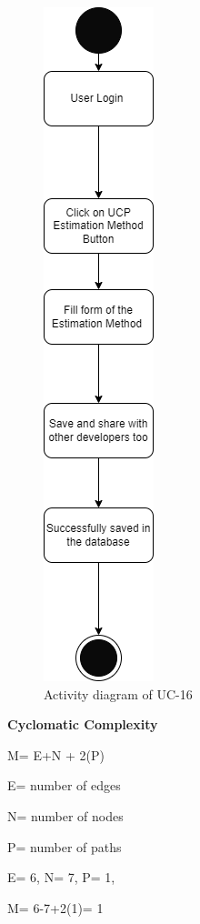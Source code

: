 \begin{figure}[H]
    \centering
    \includegraphics[scale=0.7]{./diagrams/Activity Diagram/ad-16.png}
    \caption{Activity diagram of UC-16}
    \label{fig:act-16}

\end{figure}


\textbf{Cyclomatic Complexity}

M= E+N + 2(P)

E= number of edges

N= number of nodes

P= number of paths

E= 6,
N= 7,
P= 1,

M= 6-7+2(1)= 1

